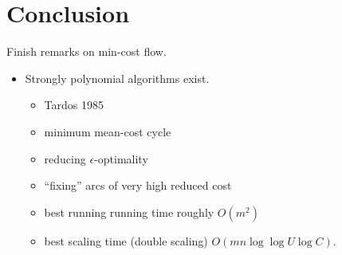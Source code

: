 \documentclass{article}
\begin{document}
\section*{Conclusion}

Finish remarks on min-cost flow.
\begin{itemize}
\item Strongly polynomial algorithms exist.
  \begin{itemize}
  \item Tardos 1985
  \item minimum mean-cost cycle
  \item reducing $\epsilon$-optimality
  \item ``fixing'' arcs of very high reduced cost
  \item best running running time roughly $O(m^2)$
  \item best scaling time (double scaling) $O(mn \log\log U \log C)$.
  \end{itemize}
\end{itemize}
\end{document}
